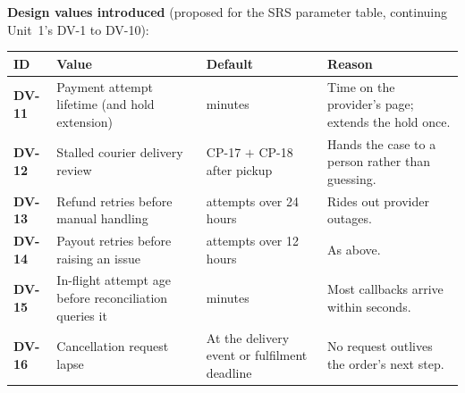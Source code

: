 \documentclass[11pt,a4paper]{article}
\newenvironment{dtable}[1]{\small\begin{longtable}{#1}}{\end{longtable}}
\begin{document}
\textbf{Design values introduced} (proposed for the SRS parameter table, continuing Unit~1's DV-1 to DV-10):
\begin{dtable}{@{}>{\bfseries}p{1.3cm}>{\raggedright\arraybackslash}p{6.0cm}>{\raggedright\arraybackslash}p{3.0cm}>{\raggedright\arraybackslash}p{4.9cm}@{}}
\toprule
\textnormal{\textbf{ID}} & \textbf{Value} & \textbf{Default} & \textbf{Reason} \\ \midrule \endhead
DV-11 & Payment attempt lifetime (and hold extension) & 15 minutes & Time on the provider's page; extends the hold once. \\
DV-12 & Stalled courier delivery review & CP-17 $+$ CP-18 after pickup & Hands the case to a person rather than guessing. \\
DV-13 & Refund retries before manual handling & 8 attempts over 24 hours & Rides out provider outages. \\
DV-14 & Payout retries before raising an issue & 6 attempts over 12 hours & As above. \\
DV-15 & In-flight attempt age before reconciliation queries it & 2 minutes & Most callbacks arrive within seconds. \\
DV-16 & Cancellation request lapse & At the delivery event or fulfilment deadline & No request outlives the order's next step. \\
\bottomrule
\end{dtable}

\end{document}
